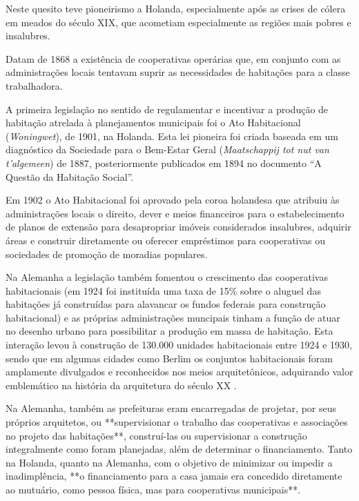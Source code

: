 \documentclass[
	12pt,				%
	oneside,			%
	a4paper,			%
	chapter=TITLE,		%
	section=TITLE,		%
	english,			%
	brazil				%
	]{abntex2}
\begin{document}
\begin{refsection}
Neste quesito teve pioneirismo a Holanda, especialmente após as crises de cólera
em meados do século XIX, que acometiam especialmente as regiões mais pobres e
insalubres.

Datam de 1868 a existência de cooperativas operárias que, em conjunto com as
administrações locais tentavam suprir as necessidades de habitações para a
classe trabalhadora.

A primeira legislação no sentido de regulamentar e incentivar a produção de
habitação atrelada à planejamentos municipais foi o Ato Habitacional
(\emph{Woningwet}), de 1901, na Holanda. Esta lei pioneira foi criada baseada em um
diagnóstico da Sociedade para o Bem-Estar Geral
(\emph{Maatschappij tot nut van t'algemeen}) de 1887, posteriormente publicados em
1894 no documento ``A Questão da Habitação Social''.

Em 1902 o Ato Habitacional foi aprovado pela coroa holandesa que atribuiu às
administrações locais o direito, dever e meios financeiros para o
estabelecimento de planos de extensão para desapropriar imóveis considerados
insalubres, adquirir áreas e construir diretamente ou oferecer empréstimos para
cooperativas ou sociedades de promoção de moradias populares.

Na Alemanha a legislação também fomentou o crescimento das cooperativas
habitacionais (em 1924 foi instituída uma taxa de 15\% sobre o aluguel das
habitações já construídas para alavancar os fundos federais para construção
habitacional) e as próprias administrações muncipais tinham a função de atuar no
desenho urbano para possibilitar a produção em massa de habitação. Esta
interação levou à construção de 130.000 unidades habitacionais entre 1924 e
1930, sendo que em algumas cidades como Berlim os conjuntos habitacionais foram
amplamente divulgados e reconhecidos nos meios arquitetônicos, adquirando valor
emblemático na história da arquitetura do século XX \autocite[90]{poleto}.
\begin{citacao}
Na Alemanha, também as prefeituras eram encarregadas de projetar, por 
seus próprios arquitetos, ou **supervisionar o trabalho das cooperativas e 
associações no projeto das habitações**, construí-las ou supervisionar a 
construção integralmente como foram planejadas, além de determinar o 
financiamento.
Tanto na Holanda, quanto na Alemanha, com o objetivo de minimizar ou 
impedir a inadimplência, **o financiamento para a casa jamais era concedido 
diretamente ao mutuário, como pessoa física, mas para cooperativas municipais**.
\cite[p.~317-318]{poleto}
\end{citacao}
\hypertarget{estatuto-da-cidade}{%
}
\end{refsection}
\end{document}
